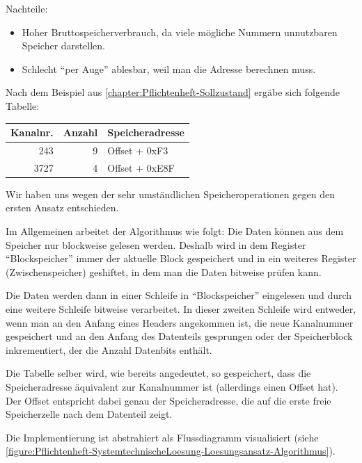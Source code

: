 Nachteile:
\begin{itemize}
    \item Hoher Bruttospeicherverbrauch, da viele mögliche Nummern unnutzbaren Speicher darstellen.
    \item Schlecht "`per Auge"' ablesbar, weil man die Adresse berechnen muss.
\end{itemize}

Nach dem Beispiel aus \autoref{chapter:Pflichtenheft-Sollzustand} ergäbe sich folgende Tabelle:

\begin{center}
    \begin{tabular}{|r|r|l|}
        \hline
        Kanalnr. & Anzahl & Speicheradresse \\
        \hline
        \hline
        243 & 9 & Offset + 0xF3 \\
        \hline
        3727 & 4 & Offset + 0xE8F \\
        \hline
    \end{tabular}
\end{center}

Wir haben uns wegen der sehr umständlichen Speicheroperationen gegen den ersten Ansatz entschieden.

Im Allgemeinen arbeitet der Algorithmus wie folgt: Die Daten können aus dem Speicher nur blockweise gelesen werden. Deshalb wird in dem Register "`Blockspeicher"' immer der aktuelle Block gespeichert und in ein weiteres Register (Zwischenspeicher) geshiftet, in dem man die Daten bitweise prüfen kann.

Die Daten werden dann in einer Schleife in "`Blockspeicher"' eingelesen und durch eine weitere Schleife bitweise verarbeitet. In dieser zweiten Schleife wird entweder, wenn man an den Anfang eines Headers angekommen ist, die neue Kanalnummer gespeichert und an den Anfang des Datenteils gesprungen oder der Speicherblock inkrementiert, der die Anzahl Datenbits enthält.

Die Tabelle selber wird, wie bereits angedeutet, so gespeichert, dass die Speicheradresse äquivalent zur Kanalnummer ist (allerdings einen Offset hat). Der Offset entspricht dabei genau der Speicheradresse, die auf die erste freie Speicherzelle nach dem Datenteil zeigt.

Die Implementierung ist abstrahiert als Flussdiagramm visualisiert (siehe \autoref{figure:Pflichtenheft-SystemtechnischeLoesung-Loesungsansatz-Algorithmus}).

